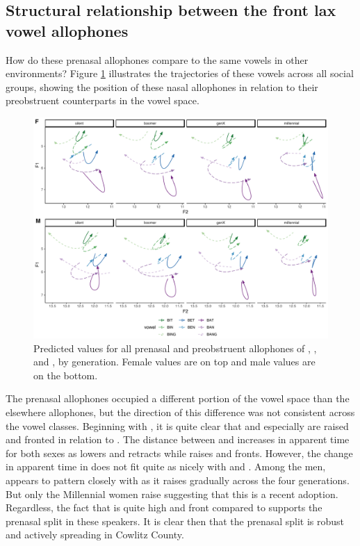\subsection{Structural relationship between the front lax vowel allophones}

How do these prenasal allophones compare to the same vowels in other environments? Figure \ref{fig:combined_nasal_plot} illustrates the trajectories of these vowels across all social groups, showing the position of these nasal allophones in relation to their preobstruent counterparts in the vowel space.

\begin{figure}[p]
    \centering
    \includegraphics[angle=90, origin=c, width = 6in]{Figures/other_figures/combined_nasal_plot.pdf}
    \caption[Predicted values for all prenasal and preobstruent allophones]{Predicted values for all prenasal and preobstruent allophones of \kit, \dress, and \trap, by generation. Female values are on top and male values are on the bottom.}
    \label{fig:combined_nasal_plot}
\end{figure}

The prenasal allophones occupied a different portion of the vowel space than the elsewhere allophones, but the direction of this difference was not consistent across the vowel classes. Beginning with \trap, it is quite clear that \ban and especially \bang are raised and fronted in relation to \bat. The distance between \ban and \bat increases in apparent time for both sexes as \bat lowers and retracts while \ban raises and fronts. However, the change in apparent time in \bang does not fit quite as nicely with \bat and \ban. Among the men, \bang appears to pattern closely with \ban as it raises gradually across the four generations. But only the Millennial women raise \bang suggesting that this is a recent adoption. Regardless, the fact that \bang is quite high and front compared to \bat supports the prenasal split in these speakers. It is clear then that the prenasal split is robust and actively spreading in Cowlitz County.


